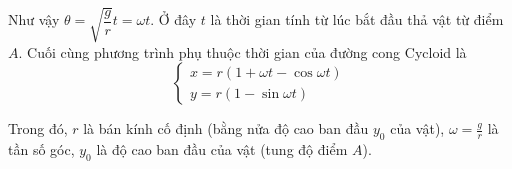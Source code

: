 \documentclass{mynotes}
\theoremstyle{definition}
\begin{document}
Như vậy $\theta = \sqrt{\dfrac{g}{r}} t = \omega t$. Ở đây $t$ là thời gian tính từ lúc bắt đầu thả vật từ điểm $A$. Cuối cùng phương trình phụ thuộc thời gian của đường cong Cycloid là
\begin{equation}
    \begin{cases}
        x = r (1 + \omega t - \cos \omega t) \\ y = r (1 - \sin \omega t)
    \end{cases}
\end{equation}

Trong đó, $r$ là bán kính cố định (bằng nửa độ cao ban đầu $y_0$ của vật), $\omega = \frac{g}{r}$ là tần số góc, $y_0$ là độ cao ban đầu của vật (tung độ điểm $A$).

\printbibliography[title={Tài liệu tham khảo}]
\end{document}
